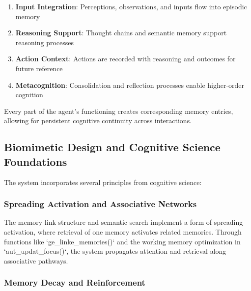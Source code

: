\documentclass[12pt,a4paper]{article}
\begin{document}
\begin{enumerate}[label=\arabic*.]
    \item \textbf{Input Integration}: Perceptions, observations, and inputs flow into episodic memory
    \item \textbf{Reasoning Support}: Thought chains and semantic memory support reasoning processes
    \item \textbf{Action Context}: Actions are recorded with reasoning and outcomes for future reference
    \item \textbf{Metacognition}: Consolidation and reflection processes enable higher-order cognition
\end{enumerate}

Every part of the agent's functioning creates corresponding memory entries, allowing for persistent cognitive continuity across interactions.

\subsection*{Biomimetic Design and Cognitive Science Foundations}

The system incorporates several principles from cognitive science:

\subsubsection*{Spreading Activation and Associative Networks}

The memory link structure and semantic search implement a form of spreading activation, where retrieval of one memory activates related memories. Through functions like `ge\1\_linke\1\_memories()` and the working memory optimization in `aut\1\_updat\1\_focus()`, the system propagates attention and retrieval along associative pathways.

\subsubsection*{Memory Decay and Reinforcement}
\end{document}

